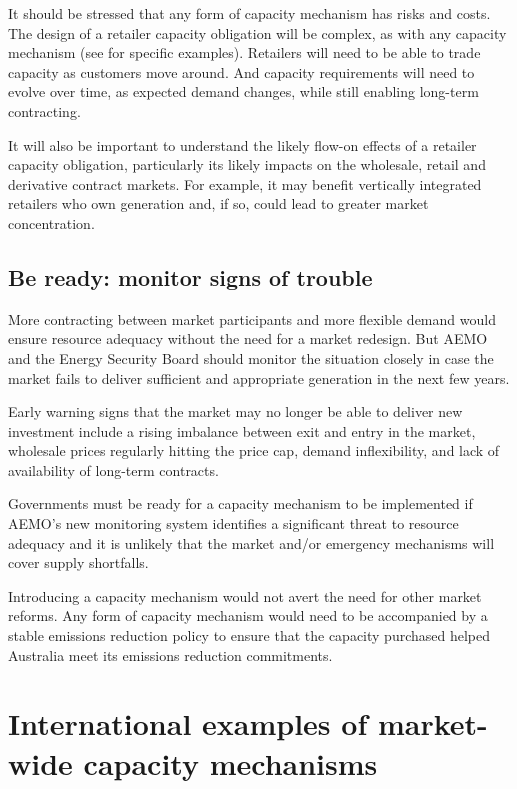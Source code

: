 \documentclass[FrontPage]{grattan}
\begin{document}
It should be stressed that any form of capacity mechanism has risks and costs. The design of a retailer capacity obligation will be complex, as with any capacity mechanism (see  for specific examples). Retailers will need to be able to trade capacity as customers move around. And capacity requirements will need to evolve over time, as expected demand changes, while still enabling long-term contracting.

It will also be important to understand the likely flow-on effects of a retailer capacity obligation, particularly its likely impacts on the wholesale, retail and derivative contract markets. For example, it may benefit vertically integrated retailers who own generation and, if so, could lead to greater market concentration.


\section{Be ready: monitor signs of trouble}\label{sec:monitor-signs-of-trouble} 
More contracting between market participants and more flexible demand would ensure resource adequacy without the need for a market redesign. But AEMO and the Energy Security Board should monitor the situation closely in case the market fails to deliver sufficient and appropriate generation in the next few years.

Early warning signs that the market may no longer be able to deliver new investment include a rising imbalance between exit and entry in the market, wholesale prices regularly hitting the price cap, demand inflexibility, and lack of availability of long-term contracts. 

Governments must be ready for a capacity mechanism to be implemented if AEMO's new monitoring system identifies a significant threat to resource adequacy and it is unlikely that the market and/or emergency mechanisms will cover supply shortfalls.

Introducing a capacity mechanism would not avert the need for other market reforms. Any form of capacity mechanism would need to be accompanied by a stable emissions reduction policy to ensure that the capacity purchased helped Australia meet its emissions reduction commitments.




\appendix

\chapter{International examples of market-wide capacity mechanisms}\label{chap:appendix-international}
\end{document}
